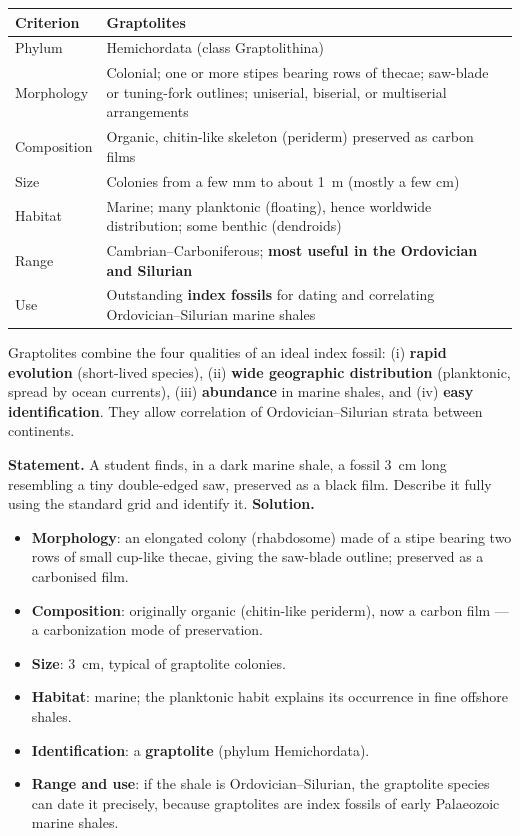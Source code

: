 \documentclass[11pt]{article}
\begin{document}
\begin{tabularx}{\linewidth}{|l|X|}
\hline
\rowcolor{popblueL} \textbf{Criterion} & \textbf{Graptolites} \\
\hline
Phylum & Hemichordata (class Graptolithina) \\
\hline
Morphology & Colonial; one or more stipes bearing rows of thecae; saw-blade or tuning-fork outlines; uniserial, biserial, or multiserial arrangements \\
\hline
Composition & Organic, chitin-like skeleton (periderm) preserved as carbon films \\
\hline
Size & Colonies from a few mm to about \SI{1}{m} (mostly a few cm) \\
\hline
Habitat & Marine; many planktonic (floating), hence worldwide distribution; some benthic (dendroids) \\
\hline
Range & Cambrian--Carboniferous; \textbf{most useful in the Ordovician and Silurian} \\
\hline
Use & Outstanding \textbf{index fossils} for dating and correlating Ordovician--Silurian marine shales \\
\hline
\end{tabularx}

\begin{aretenir}
Graptolites combine the four qualities of an ideal index fossil: (i) \textbf{rapid evolution} (short-lived species), (ii) \textbf{wide geographic distribution} (planktonic, spread by ocean currents), (iii) \textbf{abundance} in marine shales, and (iv) \textbf{easy identification}. They allow correlation of Ordovician--Silurian strata between continents.
\end{aretenir}

\begin{exoresolu}
\textbf{Statement.} A student finds, in a dark marine shale, a fossil \SI{3}{cm} long resembling a tiny double-edged saw, preserved as a black film. Describe it fully using the standard grid and identify it.
\tcblower
\textbf{Solution.}
\begin{itemize}
\item \textbf{Morphology}: an elongated colony (rhabdosome) made of a stipe bearing two rows of small cup-like thecae, giving the saw-blade outline; preserved as a carbonised film.
\item \textbf{Composition}: originally organic (chitin-like periderm), now a carbon film --- a carbonization mode of preservation.
\item \textbf{Size}: \SI{3}{cm}, typical of graptolite colonies.
\item \textbf{Habitat}: marine; the planktonic habit explains its occurrence in fine offshore shales.
\item \textbf{Identification}: a \textbf{graptolite} (phylum Hemichordata).
\item \textbf{Range and use}: if the shale is Ordovician--Silurian, the graptolite species can date it precisely, because graptolites are index fossils of early Palaeozoic marine shales.
\end{itemize}
\end{exoresolu}
\end{document}
